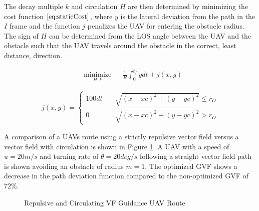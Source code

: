 \documentclass[conf]{new-aiaa}
\begin{document}
The decay multiple $k$ and circulation $H$ are then determined by minimizing the cost function $\ref{eq:staticCost}$, where $y$ is the lateral deviation from the path in the $I$ frame and the function $j$ penalizes the UAV for entering the obstacle radius. The sign of $H$ can be determined from the LOS angle between the UAV and the obstacle such that the UAV travels around the obstacle in the correct, least distance, direction.

\begin{equation}
\label{eq:staticCost}
\begin{aligned}
& \underset{H,k}{\text{minimize}}
& & \frac{1}{R}\int_{0}^{t_f}ydt + j(x,y) 
\end{aligned}
\end{equation}


\begin{equation}
j(x,y) = \left\{
\begin{array}{ll}
100dt & \quad \sqrt{(x-xc)^2+(y-yc)^2} \leq r_O \\
0 & \quad \sqrt{ (x-xc)^2+(y-yc)^2 } > r_O
\end{array}
\right.
\end{equation}




A comparison of a UAVs route using a strictly repulsive vector field versus a vector field with circulation is shown in Figure \ref{fig:noCircVsCirc}. A UAV with a speed of $u=20 m/s$ and turning rate of $\dot{\theta} = 20 deg/s$ following a straight vector field path is shown avoiding an obstacle of radius $m=1$. The optimized GVF shows a decrease in the path deviation function compared to the non-optimized GVF of $72 \% $.

\begin{figure}[H]
	\begin{subfigmatrix}{2}%
		\centering	
		\hspace*{0mm}
	\end{subfigmatrix}
	\caption{Repulsive and Circulating VF Guidance UAV Route}
	\label{fig:noCircVsCirc}
\end{figure}
\end{document}
